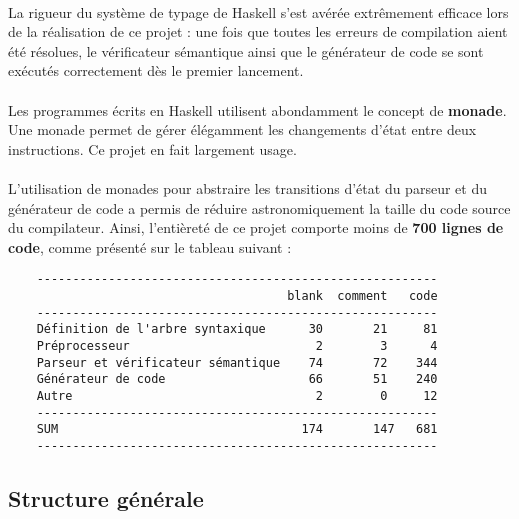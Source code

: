 \documentclass[a4paper]{article}
\begin{document}
    \paragraph{}La rigueur du système de typage de Haskell s'est avérée
extrêmement efficace lors de la réalisation de ce projet : une fois que toutes
les erreurs de compilation aient été résolues, le vérificateur sémantique ainsi
que le générateur de code se sont exécutés correctement dès le premier
lancement.

    \paragraph{}Les programmes écrits en Haskell utilisent abondamment le concept
de \textbf{monade}. \newline
Une monade permet de gérer élégamment les changements d'état entre deux
instructions. Ce projet en fait largement usage.

    \paragraph{}L'utilisation de monades pour abstraire les transitions d'état
du parseur et du générateur de code a permis de réduire astronomiquement la
taille du code source du compilateur. Ainsi, l'entièreté de ce projet comporte
moins de \textbf{700 lignes de code}, comme présenté sur le tableau suivant :

    \begin{verbatim}
    --------------------------------------------------------
                                       blank  comment   code
    --------------------------------------------------------
    Définition de l'arbre syntaxique      30       21     81
    Préprocesseur                          2        3      4
    Parseur et vérificateur sémantique    74       72    344
    Générateur de code                    66       51    240
    Autre                                  2        0     12
    --------------------------------------------------------
    SUM                                  174       147   681
    --------------------------------------------------------
    \end{verbatim}

  \subsection{Structure générale}
\end{document}
